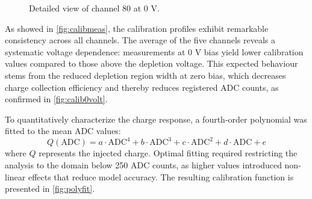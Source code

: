 \begin{figure}[H]
	\centering
	\caption{Detailed view of channel 80 at 0 V.}
	\label{fig:calib0volt}
\end{figure}

As showed in \autoref{fig:calibmeas}, the calibration profiles exhibit remarkable consistency across all channels. The average of the five channels reveals a systematic voltage dependence: measurements at 0 V bias yield lower calibration values compared to those above the depletion voltage. This expected behaviour stems from the reduced depletion region width at zero bias, which decreases charge collection efficiency and thereby reduces registered ADC counts, as confirmed in \autoref{fig:calib0volt}.

To quantitatively characterize the charge response, a fourth-order polynomial was fitted to the mean ADC values:
\begin{equation}
    Q(\text{ADC}) = a \cdot \text{ADC}^4 + b \cdot \text{ADC}^3 + c \cdot \text{ADC}^2 + d \cdot \text{ADC} + e \label{eq:fit}
\end{equation}
where $Q$ represents the injected charge. Optimal fitting required restricting the analysis to the domain below 250 ADC counts, as higher values introduced non-linear effects that reduce model accuracy. The resulting calibration function is presented in \autoref{fig:polyfit}.

